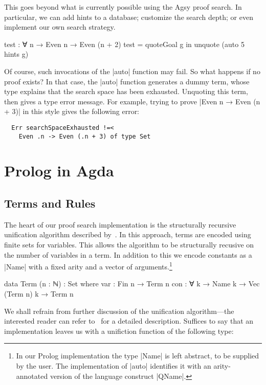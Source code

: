 \documentclass[preprint]{sigplanconf}
\begin{document}
This goes beyond what is currently possible using the Agsy proof search.
In particular, we can add hints to a database; customize the search depth;
or even implement our own search strategy.

\begin{code}
  test : ∀ {n} → Even n → Even (n + 2)
  test = quoteGoal g in unquote (auto 5 hints g)
\end{code}

Of course, such invocations of the |auto| function may fail. So what happens
if no proof exists? In that case, the |auto| function generates a dummy term,
whose type explains that the search space has been exhausted. Unquoting this
term, then gives a type error message. For example, trying to prove |Even n →
Even (n + 3)| in this style gives the following error:

\begin{verbatim}
  Err searchSpaceExhausted !=<
    Even .n -> Even (.n + 3) of type Set
\end{verbatim}



\section{Prolog in Agda}
\label{sec:prolog}

\subsection{Terms and Rules}

The heart of our proof search implementation is the structurally recursive
unification algorithm described by~\citet{mcbride}. In this approach, terms
are encoded using finite sets for variables. This allows the algorithm to
be structurally recusive on the number of variables in a term. In addition
to this we encode constants as a |Name| with a fixed arity and a vector of
arguments.\footnote{
  In our Prolog implementation the type |Name| is left abstract, to be
  supplied by the user. The implementation of |auto| identifies it with
  an arity-annotated version of the language construct |QName|.
}

\begin{code}
  data Term (n : ℕ) : Set where
    var  : Fin n → Term n
    con  : ∀ {k} → Name k → Vec (Term n) k → Term n
\end{code}

We shall refrain from further discussion of the unification algorithm---the
interested reader can refer to~\cite{mcbride} for a detailed description.
Suffices to say that an implementation leaves us with a unifiction function
of the following type:
\end{document}
